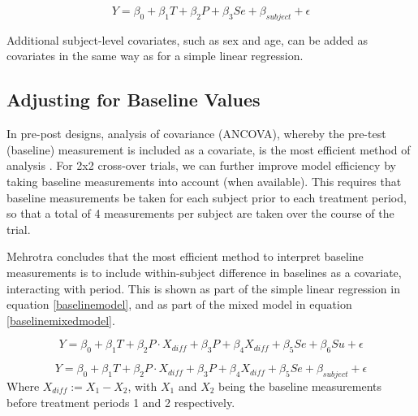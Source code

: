 \documentclass[12pt, TexShade, letterpaper]{report}
\begin{document}
\begin{equation}
   Y = \beta_0 + \beta_1 T + \beta_2 P + \beta_3 Se + \beta_{subject} + \epsilon
   \label{mixedmodelregression}
\end{equation}

Additional subject-level covariates, such as sex and age, can be added as covariates in the same way as for a simple linear regression.

\subsection{Adjusting for Baseline Values}
In pre-post designs, analysis of covariance (ANCOVA), whereby the pre-test (baseline) measurement is included as a covariate, is the most efficient method of analysis \cite{wan2021statistical}. For 2x2 cross-over trials, we can further improve model efficiency by taking baseline measurements into account (when available). This requires that baseline measurements be taken for each subject prior to each treatment period, so that a total of 4 measurements per subject are taken over the course of the trial.

Mehrotra \cite{mehrotra2014} concludes that the most efficient method to interpret baseline measurements is to include within-subject difference in baselines as a covariate, interacting with period. This is shown as part of the simple linear regression in equation \ref{baselinemodel}, and as part of the mixed model in equation \ref{baselinemixedmodel}.

\begin{equation}
    Y = \beta_0 + \beta_1 T + \beta_2 P \cdot X_{diff} + \beta_3 P +
    \beta_4 X_{diff} + \beta_5 Se + \beta_6 Su + \epsilon
    \label{baselinemodel}
\end{equation}

\begin{equation}
    Y = \beta_0 + \beta_1 T + \beta_2 P \cdot X_{diff} + \beta_3 P +
    \beta_4 X_{diff} + \beta_5 Se + \beta_{subject} + \epsilon
    \label{baselinemixedmodel}
\end{equation}
Where $X_{diff} := X_1 - X_2$, with $X_1$ and $X_2$ being the baseline measurements before treatment periods 1 and 2 respectively.
\end{document}
